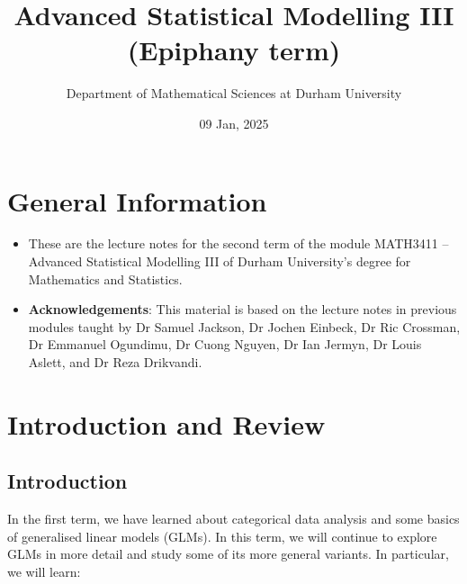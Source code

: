 \documentclass[
  12pt,
]{book}
\title{Advanced Statistical Modelling III (Epiphany term)}
\author{Department of Mathematical Sciences at Durham University}
\date{09 Jan, 2025}
\providecommand{\tightlist}{%
  \setlength{\itemsep}{0pt}\setlength{\parskip}{0pt}}
\newcommand{\pr}[2][]{P_{#1}\left(#2\right)}
\newcommand{\spac}[1]{\mathcal{#1}}
\def \given {|}
\newcommand{\knowledge}{K}
\newcommand{\know}{\knowledge}
\newcommand{\e}[1]{{\textrm E}[#1]}
\newcommand{\var}[1]{{\textrm{Var}}[#1]}
\newcommand{\cov}[2]{{\textrm{Cov}}[#1,#2]}
\newcommand{\real}{{\mathbb R}}
\newcommand{\set}[1]{\{#1\}}
\newcommand{\st}{:\,}
\newcommand{\normal}{{\mathcal N}}
\newcommand{\natnos}{\mathbb{N}}
\newcommand{\logpr}[1]{l\left(#1\right)}
\newcommand{\hbeta}{\hat{\beta}}
\newcommand{\isp}{\;}
\newcommand{\mc}{\mathcal}
\newcommand{\mb}[1]{\boldsymbol{#1}}
\newcommand{\eqa}{\stackrel{a}{=}}
\begin{document}
\maketitle

{
\setcounter{tocdepth}{1}
\tableofcontents
}
\chapter*{General Information}\label{general-information}

\begin{itemize}
\tightlist
\item
  These are the lecture notes for the second term of the module MATH3411 -- Advanced Statistical Modelling III of Durham University's degree for Mathematics and Statistics.
\item
  \textbf{Acknowledgements}: This material is based on the lecture notes in previous modules taught by Dr Samuel Jackson, Dr Jochen Einbeck, Dr Ric Crossman, Dr Emmanuel Ogundimu, Dr Cuong Nguyen, Dr Ian Jermyn, Dr Louis Aslett, and Dr Reza Drikvandi.
\end{itemize}

\chapter{Introduction and Review}\label{introduction}

\renewcommand{\pr}[2][]{P_{#1}\left(#2\right)}
\renewcommand{\spac}[1]{\mathcal{#1}}
\renewcommand{\given}{|}
\renewcommand{\knowledge}{K}
\renewcommand{\know}{\knowledge}
\renewcommand{\e}[1]{{\mathrm E}[#1]}
\renewcommand{\var}[1]{{\mathrm{Var}}[#1]}
\renewcommand{\cov}[1]{{\mathrm{Cov}}[#1]}
\renewcommand{\real}{{\mathbb R}}
\renewcommand{\set}[1]{\left\{#1\right\}}
\renewcommand{\st}{:\,}
\renewcommand{\normal}{{\mathcal N}}
\renewcommand{\natnos}{\mathbb{N}}
\renewcommand{\isp}{\;}
\renewcommand{\mc}{\mathcal}
\renewcommand{\hbeta}{\hat{\mb{\beta}}}
\renewcommand{\mb}[1]{\boldsymbol{#1}}
\renewcommand{\eqa}{\stackrel{a}{=}}
\renewcommand{\logpr}[1]{l\left(#1\right)}

\section{Introduction}\label{introduction-1}

In the first term, we have learned about categorical data analysis and some basics of generalised linear models (GLMs). In this term, we will continue to explore GLMs in more detail and study some of its more general variants. In particular, we will learn:
\end{document}
